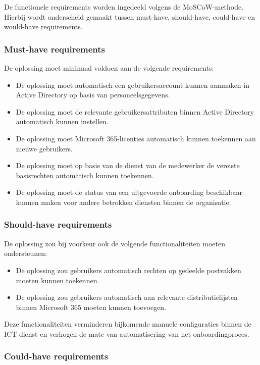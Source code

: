 De functionele requirements worden ingedeeld volgens de MoSCoW-methode. Hierbij wordt onderscheid gemaakt tussen must-have, should-have, could-have en would-have requirements.

\subsubsection{Must-have requirements}

De oplossing moet minimaal voldoen aan de volgende requirements:

\begin{itemize}
    \item De oplossing moet automatisch een gebruikersaccount kunnen aanmaken in Active Directory op basis van personeelsgegevens.
    \item De oplossing moet de relevante gebruikersattributen binnen Active Directory automatisch kunnen instellen.
    \item De oplossing moet Microsoft 365-licenties automatisch kunnen toekennen aan nieuwe gebruikers.
    \item De oplossing moet op basis van de dienst van de medewerker de vereiste basisrechten automatisch kunnen toekennen.
    \item De oplossing moet de status van een uitgevoerde onboarding beschikbaar kunnen maken voor andere betrokken diensten binnen de organisatie.
\end{itemize}

\subsubsection{Should-have requirements}

De oplossing zou bij voorkeur ook de volgende functionaliteiten moeten ondersteunen:

\begin{itemize}
    \item De oplossing zou gebruikers automatisch rechten op gedeelde postvakken moeten kunnen toekennen.
    \item De oplossing zou gebruikers automatisch aan relevante distributielijsten binnen Microsoft 365 moeten kunnen toevoegen.
\end{itemize}

Deze functionaliteiten verminderen bijkomende manuele configuraties binnen de ICT-dienst en verhogen de mate van automatisering van het onboardingproces.

\subsubsection{Could-have requirements}


